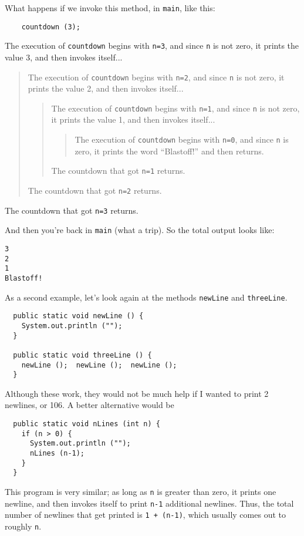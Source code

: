 \documentclass{book}
\begin{document}
What happens if we invoke this method, in {\tt main}, like
this:

\begin{verbatim}
    countdown (3);
\end{verbatim}
%
The execution of {\tt countdown} begins with {\tt n=3}, and
since {\tt n} is not zero, it prints the value 3, and then
invokes itself...

\begin{quote}
The execution of {\tt countdown} begins with {\tt n=2}, and
since {\tt n} is not zero, it prints the value 2, and then
invokes itself...

\begin{quote}
The execution of {\tt countdown} begins with {\tt n=1}, and
since {\tt n} is not zero, it prints the value 1, and then
invokes itself...

\begin{quote}
The execution of {\tt countdown} begins with {\tt n=0}, and
since {\tt n} is zero, it prints the word ``Blastoff!''
and then returns.
\end{quote}

The countdown that got {\tt n=1} returns.

\end{quote}

The countdown that got {\tt n=2} returns.

\end{quote}

The countdown that got {\tt n=3} returns.

\noindent And then you're back in {\tt main} (what a trip).  So the
total output looks like:

\begin{verbatim}
3
2
1
Blastoff!
\end{verbatim}
%
As a second example, let's look again at the methods
{\tt newLine} and {\tt threeLine}.

\begin{verbatim}
  public static void newLine () {
    System.out.println ("");
  }

  public static void threeLine () {
    newLine ();  newLine ();  newLine ();
  }
\end{verbatim}
%
Although these work, they would not be much help if I wanted
to print 2 newlines, or 106.  A better alternative would be

\begin{verbatim}
  public static void nLines (int n) {
    if (n > 0) {
      System.out.println ("");
      nLines (n-1);
    }
  }
\end{verbatim}
%
This program is very similar; as long as {\tt n} is greater
than zero, it prints one newline, and then invokes itself to
print {\tt n-1} additional newlines.  Thus, the total number
of newlines that get printed is {\tt 1 + (n-1)}, which usually
comes out to roughly {\tt n}.
\end{document}
